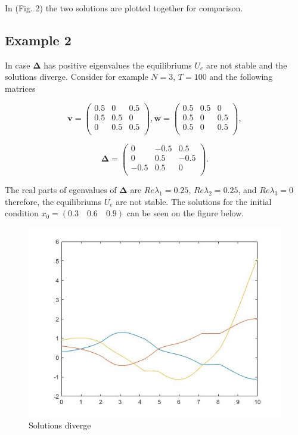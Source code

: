 \documentclass[a4paper,10pt, english]{article}
\begin{document}
In (Fig. 2) the two solutions are plotted together for comparison.

\newpage


\subsection{Example 2}
In case  $\mathbf{\Delta}$ has positive eigenvalues the equilibriums  $U_e$ are not stable and the solutions diverge. Consider for example $N=3$, $T=100$ and the following matrices

\[\mathbf{v} =  \left( \begin{array}{ccc}
 0.5& 0& 0.5\\ 
 0.5 &0.5 &0\\
 0& 0.5& 0.5\\
\end{array} \right),
%
\mathbf{w} = 
\left( \begin{array}{ccc}
0.5& 0.5& 0\\ 
0.5 &0 &0.5\\ 
0.5& 0& 0.5\\
\end{array} \right),
\]

$$
\mathbf{\Delta} = 
\left(
\begin{matrix}
0   & -0.5 & 0.5 \\
0 &  0.5 & -0.5 \\
-0.5 &  0.5 & 0 \\
\end{matrix}
\right).
$$


The real parts of egenvalues of $\mathbf{\Delta}$ are  $Re\lambda_1 = 0.25$,  $Re\lambda_2 = 0.25$, and $Re\lambda_3 = 0$ therefore, the equilibriums 
$U_e$ are not stable. The solutions for the initial condition $x_0 = (0.3\quad 0.6\quad 0.9)$ can be seen on the figure below. 
\begin{figure}[ht]
\label{fig_osc}
\centering
\includegraphics[scale= 0.4]{explode.jpg}
\caption{Solutions diverge}
\end{figure}
\end{document}
